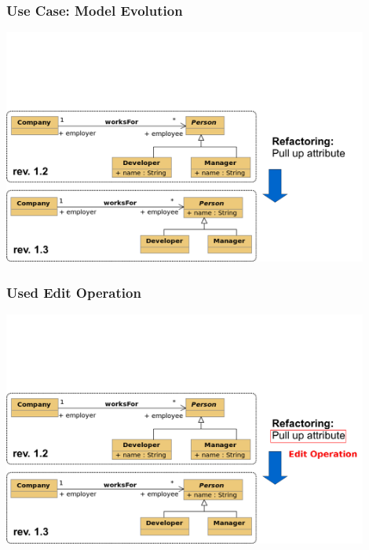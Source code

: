 \begin{frame}[t]
  \frametitle{Use Case: Model Evolution}
  \begin{center}
  \includegraphics[width=0.9\textwidth]{images/uml_example_05_01}
  \end{center}
\end{frame}
\begin{frame}[t,noframenumbering]
  \frametitle{Used Edit Operation}
  \begin{center}
  \includegraphics[width=0.9\textwidth]{images/uml_example_05_02}
  \end{center}
\end{frame}

